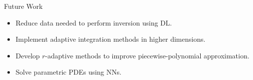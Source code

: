 \begin{frame}{Future Work}

\begin{itemize}
\item Reduce data needed to perform inversion using DL.
\vspace{0.5cm}
\item Implement adaptive integration methods in higher dimensions.
\vspace{0.5cm}
\item Develop $r$-adaptive methods to improve piecewise-polynomial approximation.
\vspace{0.5cm}
\item Solve parametric PDEs using NNs.
\end{itemize}

\end{frame}
